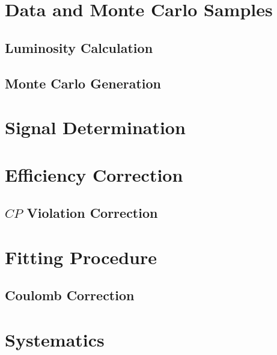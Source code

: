 \section{Data and Monte Carlo Samples}
\label{sec:samples}

\subsection{Luminosity Calculation}
\label{ssec:luminosity}

\subsection{Monte Carlo Generation}
\label{ssec:monte_carlo}


\section{Signal Determination}
\label{sec:signal}


\section{Efficiency Correction}
\label{sec:efficiency}

\subsection{$CP$ Violation Correction}
\label{ssec:cp_correction}


\section{Fitting Procedure}
\label{sec:fitting}

\subsection{Coulomb Correction}
\label{ssec:coulomb}


\section{Systematics}
\label{sec:systematics}


